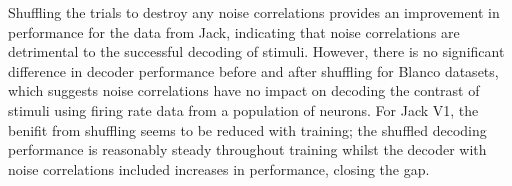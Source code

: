 Shuffling the trials to destroy any noise correlations provides an improvement in performance for the data from Jack, indicating that noise correlations are detrimental to the successful decoding of stimuli. However, there is no significant difference in decoder performance before and after shuffling for Blanco datasets, which suggests noise correlations have no impact on decoding the contrast of stimuli using firing rate data from a population of neurons.
For Jack V1, the benifit from shuffling seems to be reduced with training; the shuffled decoding performance is reasonably steady throughout training whilst the decoder with noise correlations included increases in performance, closing the gap.



